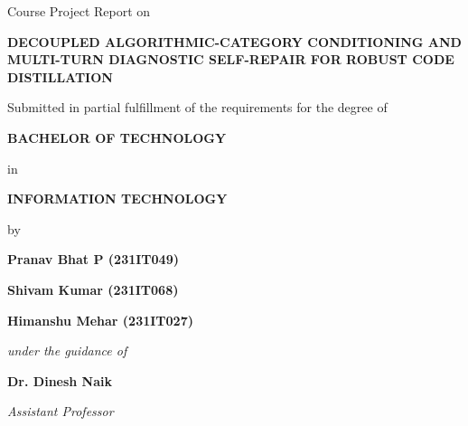 \documentclass[12pt,a4paper]{article}
\begin{document}
\pagestyle{empty}

\begin{center}
    {\large Course Project Report on\par}
    
    \vspace{0.8cm}
    
    {\fontsize{14}{18}\selectfont \bfseries DECOUPLED ALGORITHMIC-CATEGORY CONDITIONING AND MULTI-TURN DIAGNOSTIC SELF-REPAIR FOR ROBUST CODE DISTILLATION\par}
    
    \vspace{1.0cm}
    
    {\large Submitted in partial fulfillment of the requirements for the degree of\par}
    
    \vspace{0.4cm}
    
    {\large \bfseries BACHELOR OF TECHNOLOGY\par}
    
    \vspace{0.2cm}
    {\large in\par}
    \vspace{0.2cm}
    
    {\large \bfseries INFORMATION TECHNOLOGY\par}
    
    \vspace{0.8cm}
    
    {\large by\par}
    
    \vspace{0.4cm}
    
    {\large \bfseries Pranav Bhat P (231IT049)\par}
    \vspace{0.15cm}
    {\large \bfseries Shivam Kumar (231IT068)\par}
    \vspace{0.15cm}
    {\large \bfseries Himanshu Mehar (231IT027)\par}
    
    \vspace{0.9cm}
    
    {\large \itshape under the guidance of\par}
    
    \vspace{0.3cm}
    
    {\large \bfseries Dr. Dinesh Naik\par}
    \vspace{0.1cm}
    {\large \itshape Assistant Professor\par}
    

\end{center}
\end{document}
